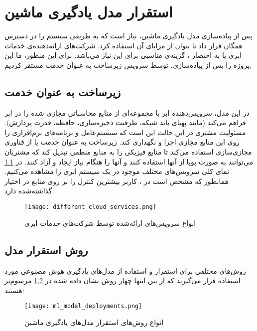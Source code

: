 \chapter{استقرار مدل یادگیری ماشین}

پس از پیاده‌سازی مدل یادگیری ماشین، نیاز است که به طریقی سیستم را در دسترس همگان قرار داد تا بتوان از مزایای آن استفاده کرد. شرکت‌های ارائه‌دهنده‌ی خدمات ابری یا به اختصار ، گزینه‌ی مناسبی برای این نیاز می‌باشد. برای این منظور، ما این پروژه را پس از پیاده‌سازی، توسط سرویس زیرساخت به عنوان خدمت مستقر کردیم.


\section{زیرساخت به عنوان خدمت}
در این مدل، سرویس‌دهنده ابر یا  مجموعه‌ای از منابع محاسباتی مجازی شده را در ابر فراهم می‌کند (مانند پهنای باند شبکه، ظرفیت ذخیره‌سازی، حافظه، قدرت پردازش). مسئولیت مشتری در این حالت این است که سیستم‌عامل و برنامه‌های نرم‌افزاری را روی این منابع مجازی اجرا و نگهداری کند. زیرساخت به عنوان خدمت یا  از فناوری مجازی‌سازی استفاده می‌کند تا منابع فیزیکی را به منابع منطقی تبدیل کند که مشتریان می‌توانند به صورت پویا از آنها استفاده کنند و آنها را هنگام نیاز ایجاد و آزاد کنند\cite{youssef2012exploring}. در \cref{fig:different_cloud_services}\cite{serrano2015infrastructure} نمای کلی سرویس‌های مختلف موجود در یک سیستم ابری را مشاهده می‌کنیم. همانطور که مشخص است در ، کاربر بیشترین کنترل را بر روی منابع در اختیار گذاشته‌شده دارد\cite{serrano2015infrastructure}.



\begin{figure}[!h]
\centerline{\texttt{[image: different\_cloud\_services.png]}}
\caption{انواع سرویس‌های ارائه‌شده توسط شرکت‌های خدمات ابری\cite{serrano2015infrastructure}}
\label{fig:different_cloud_services}
\end{figure}


\section{روش‌ استقرار مدل}
 روش‌های مختلفی برای استقرار و استفاده از مدل‌های یادگیری هوش مصنوعی مورد استفاده قرار می‌گیرند که از بین اینها چهار روش نشان داده‌ شده در \cref{fig:ml_model_deployments}\cite{kaggleMLdeployments} مرسوم‌تر هستند:

\begin{figure}[!h]
\centerline{\texttt{[image: ml\_model\_deployments.png]}}
\caption{انواع روش‌های استقرار مدل‌های یادگیری ماشین\cite{kaggleMLdeployments}}
\label{fig:ml_model_deployments}
\end{figure}

